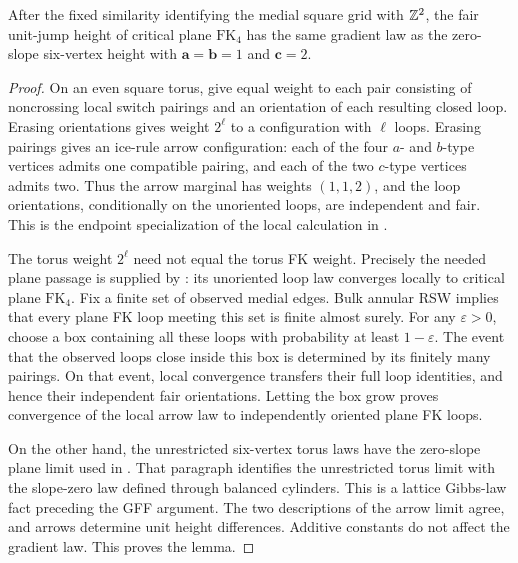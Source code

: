 \begin{lemma}
\label{lem:rr-bkw}
After the fixed similarity identifying the medial square grid with
$\mathbb Z^2$, the fair unit-jump height of critical plane $\mathrm{FK}_4$ has the
same gradient law as the zero-slope six-vertex height with
$\mathbf a=\mathbf b=1$ and $\mathbf c=2$.
\end{lemma}

\begin{proof}
On an even square torus, give equal weight to each pair consisting
of noncrossing local switch pairings and an orientation of each
resulting closed loop.  Erasing orientations gives weight $2^\ell$
to a configuration with $\ell$ loops.  Erasing pairings gives an
ice-rule arrow configuration: each of the four $a$- and $b$-type
vertices admits one compatible pairing, and each of the two
$c$-type vertices admits two.  Thus the arrow marginal has weights
$(1,1,2)$, and the loop orientations, conditionally on the
unoriented loops, are independent and fair.  This is the endpoint
specialization of the local calculation in
\cite[Section~2, Equations~(2.1)--(2.3)]{Lis2021}.

The torus weight $2^\ell$ need not equal the torus FK weight.
Precisely the needed plane passage is supplied by
\cite[Lemma~3.1]{Lis2021}: its unoriented loop law converges locally
to critical plane $\mathrm{FK}_4$.  Fix a finite set of observed medial
edges.  Bulk annular RSW implies that every plane FK loop meeting
this set is finite almost surely.  For any $\varepsilon>0$, choose
a box containing all these loops with probability at least
$1-\varepsilon$.  The event that the observed loops close inside
this box is determined by its finitely many pairings.  On that
event, local convergence transfers their full loop identities,
and hence their independent fair orientations.  Letting the box
grow proves convergence of the local arrow law to independently
oriented plane FK loops.

On the other hand, the unrestricted six-vertex torus laws have the
zero-slope plane limit used in
\cite[Theorem~2.2 and the paragraph following it]{DKLM2026}.
That paragraph identifies the unrestricted torus limit with the
slope-zero law defined through balanced cylinders.  This is a
lattice Gibbs-law fact preceding the GFF
argument.  The two descriptions of the arrow limit agree, and
arrows determine unit height differences.  Additive constants do
not affect the gradient law.  This proves the lemma.
\end{proof}

